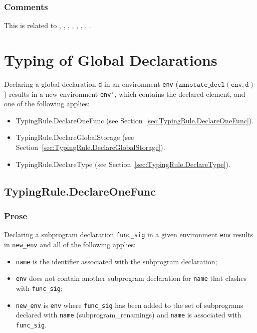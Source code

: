 \documentclass{book}
\newcommand\subprogramrenamings[0]{\textsf{subprogram\_renamings}}
\newcommand\declaredecl[1]{\texttt{annotate\_decl}(#1)}
\newcommand\tenv[0]{\texttt{env}}
\begin{document}
\subsection{Comments}
This is related to , , , ,
, , , .

\chapter{Typing of Global Declarations}

Declaring a global declaration \texttt{d} in an environment \texttt{env} ($\declaredecl{\tenv, \texttt{d}}$)
results in a new environment \texttt{env'}, which contains the declared element, and one of the following applies:
\begin{itemize}
  \item TypingRule.DeclareOneFunc (see Section~\ref{sec:TypingRule.DeclareOneFunc}).
  \item TypingRule.DeclareGlobalStorage (see Section~\ref{sec:TypingRule.DeclareGlobalStorage}).
  \item TypingRule.DeclareType (see Section~\ref{sec:TypingRule.DeclareType}).
\end{itemize}

\section{TypingRule.DeclareOneFunc \label{sec:TypingRule.DeclareOneFunc}}
\subsection{Prose}
Declaring a subprogram declaration \texttt{func\_sig} in a given environment \texttt{env} results
in \texttt{new\_env} and all of the following applies:
\begin{itemize}
  \item \texttt{name} is the identifier associated with the subprogram declaration;
  \item \texttt{env} does not contain another subprogram declaration for \texttt{name} that clashes with \texttt{func\_sig};
  \item \texttt{new\_env} is \texttt{env} where
  \texttt{func\_sig} has been added to the set of subprograms declared with \texttt{name} (\subprogramrenamings)
  and \texttt{name} is associated with \texttt{func\_sig}.
\end{itemize}
\end{document}

